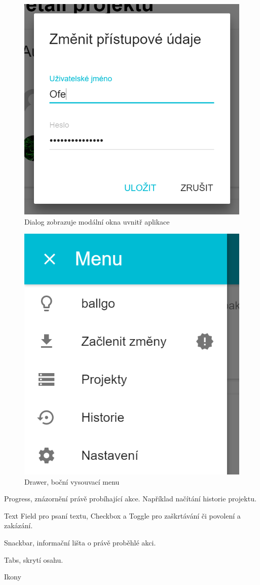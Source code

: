 \begin{figure}
	\centering
	\includegraphics[scale=0.5]{sections/ui/images/Dialog.png}
	\caption[Dialog]{Dialog zobrazuje modální okna uvnitř aplikace}
\end{figure}

\begin{figure}
	\centering
	\includegraphics[scale=0.5]{sections/ui/images/Drawer.png}
	\caption[Drawer]{Drawer, boční vysouvací menu}
\end{figure}


Progress, znázornění právě probíhající akce. Například načítání historie projektu.

Text Field pro psaní textu, Checkbox a Toggle pro zaškrtávání či povolení a zakázání.

Snackbar, informační lišta o právě proběhlé akci.

Tabs, skrytí osahu.

Ikony

